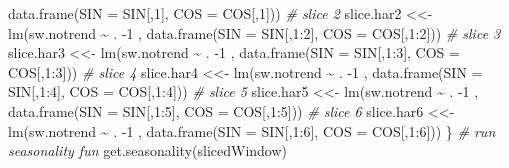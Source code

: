 \documentclass[
]{article}
\newenvironment{Shaded}{\begin{snugshade}}{\end{snugshade}}
\newcommand{\AttributeTok}[1]{\textcolor[rgb]{0.77,0.63,0.00}{#1}}
\newcommand{\CommentTok}[1]{\textcolor[rgb]{0.56,0.35,0.01}{\textit{#1}}}
\newcommand{\DecValTok}[1]{\textcolor[rgb]{0.00,0.00,0.81}{#1}}
\newcommand{\FunctionTok}[1]{\textcolor[rgb]{0.00,0.00,0.00}{#1}}
\newcommand{\NormalTok}[1]{#1}
\newcommand{\OtherTok}[1]{\textcolor[rgb]{0.56,0.35,0.01}{#1}}
\newcommand{\SpecialCharTok}[1]{\textcolor[rgb]{0.00,0.00,0.00}{#1}}
\begin{document}
\begin{Shaded}
\begin{Highlighting}[]
                   \FunctionTok{data.frame}\NormalTok{(}\AttributeTok{SIN =}\NormalTok{ SIN[,}\DecValTok{1}\NormalTok{], }\AttributeTok{COS =}\NormalTok{ COS[,}\DecValTok{1}\NormalTok{]))}
  \CommentTok{\# slice 2}
\NormalTok{  slice.har2 }\OtherTok{\textless{}\textless{}{-}} \FunctionTok{lm}\NormalTok{(sw.notrend }\SpecialCharTok{\textasciitilde{}}\NormalTok{ . }\SpecialCharTok{{-}}\DecValTok{1}\NormalTok{ ,}
                   \FunctionTok{data.frame}\NormalTok{(}\AttributeTok{SIN =}\NormalTok{ SIN[,}\DecValTok{1}\SpecialCharTok{:}\DecValTok{2}\NormalTok{], }\AttributeTok{COS =}\NormalTok{ COS[,}\DecValTok{1}\SpecialCharTok{:}\DecValTok{2}\NormalTok{]))}
  \CommentTok{\# slice 3}
\NormalTok{  slice.har3 }\OtherTok{\textless{}\textless{}{-}} \FunctionTok{lm}\NormalTok{(sw.notrend }\SpecialCharTok{\textasciitilde{}}\NormalTok{ . }\SpecialCharTok{{-}}\DecValTok{1}\NormalTok{ ,}
                    \FunctionTok{data.frame}\NormalTok{(}\AttributeTok{SIN =}\NormalTok{ SIN[,}\DecValTok{1}\SpecialCharTok{:}\DecValTok{3}\NormalTok{], }\AttributeTok{COS =}\NormalTok{ COS[,}\DecValTok{1}\SpecialCharTok{:}\DecValTok{3}\NormalTok{]))}
  \CommentTok{\# slice 4}
\NormalTok{  slice.har4 }\OtherTok{\textless{}\textless{}{-}} \FunctionTok{lm}\NormalTok{(sw.notrend }\SpecialCharTok{\textasciitilde{}}\NormalTok{ . }\SpecialCharTok{{-}}\DecValTok{1}\NormalTok{ ,}
                    \FunctionTok{data.frame}\NormalTok{(}\AttributeTok{SIN =}\NormalTok{ SIN[,}\DecValTok{1}\SpecialCharTok{:}\DecValTok{4}\NormalTok{], }\AttributeTok{COS =}\NormalTok{ COS[,}\DecValTok{1}\SpecialCharTok{:}\DecValTok{4}\NormalTok{]))}
  \CommentTok{\# slice 5}
\NormalTok{  slice.har5 }\OtherTok{\textless{}\textless{}{-}} \FunctionTok{lm}\NormalTok{(sw.notrend }\SpecialCharTok{\textasciitilde{}}\NormalTok{ . }\SpecialCharTok{{-}}\DecValTok{1}\NormalTok{ ,}
                    \FunctionTok{data.frame}\NormalTok{(}\AttributeTok{SIN =}\NormalTok{ SIN[,}\DecValTok{1}\SpecialCharTok{:}\DecValTok{5}\NormalTok{], }\AttributeTok{COS =}\NormalTok{ COS[,}\DecValTok{1}\SpecialCharTok{:}\DecValTok{5}\NormalTok{]))}
  \CommentTok{\# slice 6}
\NormalTok{  slice.har6 }\OtherTok{\textless{}\textless{}{-}} \FunctionTok{lm}\NormalTok{(sw.notrend }\SpecialCharTok{\textasciitilde{}}\NormalTok{ . }\SpecialCharTok{{-}}\DecValTok{1}\NormalTok{ ,}
                    \FunctionTok{data.frame}\NormalTok{(}\AttributeTok{SIN =}\NormalTok{ SIN[,}\DecValTok{1}\SpecialCharTok{:}\DecValTok{6}\NormalTok{], }\AttributeTok{COS =}\NormalTok{ COS[,}\DecValTok{1}\SpecialCharTok{:}\DecValTok{6}\NormalTok{]))}
\NormalTok{\}}
\CommentTok{\# run seasonality fun}
\FunctionTok{get.seasonality}\NormalTok{(slicedWindow)}


\end{Highlighting}
\end{Shaded}
\end{document}
